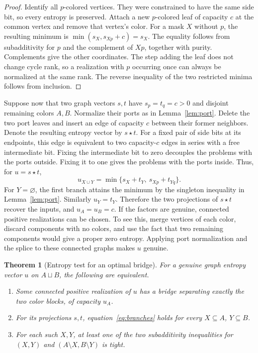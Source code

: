 \documentclass[11pt]{article}
\newtheorem{theorem}{Theorem}[section]
\begin{document}
\begin{proof}
Identify all \(p\)-colored vertices. They were constrained to have the
same side bit, so every entropy is preserved. Attach a new \(p\)-colored
leaf of capacity \(c\) at the common vertex and remove that vertex's
color. For a mask \(X\) without \(p\), the resulting minimum is
\(\min(s_X,s_{Xp}+c)=s_X\). The equality follows from subadditivity for
\(p\) and the complement of \(Xp\), together with purity. Complements
give the other coordinates. The step adding the leaf does not change
cycle rank, so a realization with \(p\) occurring once can always be
normalized at the same rank. The reverse inequality of the two
restricted minima follows from inclusion.
\end{proof}

Suppose now that two graph vectors \(s,t\) have \(s_p=t_q=c>0\) and
disjoint remaining colors \(A,B\). Normalize their ports as in
Lemma~\ref{lem:port}. Delete the two port leaves and insert an edge of
capacity \(c\) between their former neighbors. Denote the resulting
entropy vector by \(s\star t\). For a fixed pair of side bits at its
endpoints, this edge is equivalent to two capacity-\(c\) edges in series
with a free intermediate bit. Fixing the intermediate bit to zero
decouples the problems with the ports outside. Fixing it to one gives
the problems with the ports inside. Thus, for \(u=s\star t\),
\begin{equation}
 u_{X\cup Y}=\min\{s_X+t_Y,\ s_{Xp}+t_{Yq}\}.
 \label{eq:branches}
\end{equation}
For \(Y=\varnothing\), the first branch attains the minimum by the
singleton inequality in Lemma~\ref{lem:port}. Similarly \(u_Y=t_Y\).
Therefore the two projections of \(s\star t\) recover the inputs, and
\(u_A=u_B=c\). If the factors are genuine, connected positive
realizations can be chosen. To see this, merge vertices of each color,
discard components with no colors, and use the fact that two remaining
components would give a proper zero entropy. Applying port normalization
and the splice to these connected graphs makes \(u\) genuine.

\begin{theorem}[Entropy test for an optimal bridge]
\label{thm:criterion}
For a genuine graph entropy vector \(u\) on \(A\sqcup B\), the following
are equivalent.
\begin{enumerate}
\item Some connected positive realization of \(u\) has a bridge
  separating exactly the two color blocks, of capacity \(u_A\).
\item For its projections \(s,t\), equation~\eqref{eq:branches} holds for
  every \(X\subseteq A\), \(Y\subseteq B\).
\item For each such \(X,Y\), at least one of the two subadditivity
  inequalities for \((X,Y)\) and \((A\setminus X,B\setminus Y)\) is tight.
\end{enumerate}
\end{theorem}
\end{document}
